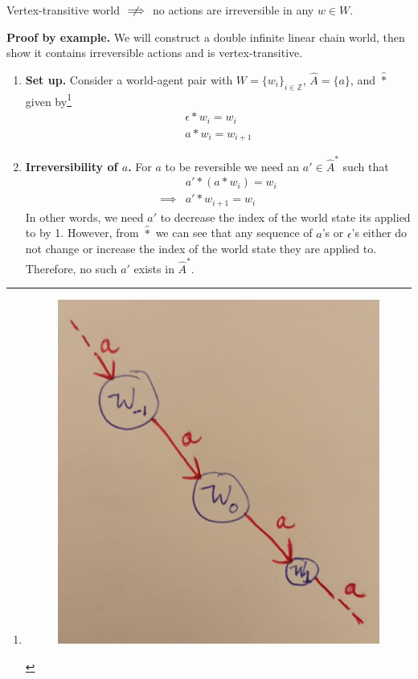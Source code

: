 \begin{propositionE}
    Vertex-transitive world $\centernot\implies$ no actions are irreversible in any $w \in W$.
\end{propositionE}
\begin{proofE}
    \textbf{Proof by example.}
    We will construct a double infinite linear chain world, then show it contains irreversible actions and is vertex-transitive.
\begin{enumerate}[(1)]
    \item \textbf{Set up.}
    Consider a world-agent pair with $W = \{w_{i}\}_{i \in \mathbb{Z}}$, $\hat{A} = \{a\}$, and $\hat{\ast}$ given by\footnote{\begin{figure}[H]
        \includegraphics[width=0.5\linewidth]{6BeyondSBDRLLocalAlgebras/Images/infinite_double_linear_chain_world.jpeg}
        \caption{
        }
    \end{figure}}
    \begin{align}
        \epsilon \ast w_{i} = w_{i} \\
        a \ast w_{i} = w_{i+1}
    \end{align}

    \item \textbf{Irreversibility of $a$.}
    For $a$ to be reversible we need an $a' \in \hat{A}^{*}$ such that
    \begin{align}
        & a' \ast (a \ast w_{i}) = w_{i} \\
        \implies & a' \ast w_{i + 1} = w_{i}
    \end{align}
    In other words, we need $a'$ to decrease the index of the world state its applied to by 1.
    However, from $\hat{\ast}$ we can see that any sequence of $a$'s or $\epsilon$'s either do not change or increase the index of the world state they are applied to.
    Therefore, no such $a'$ exists in $\hat{A}^{*}$.


\end{enumerate}
\end{proofE}
